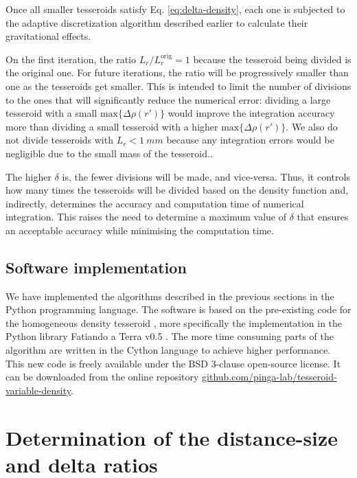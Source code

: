 \documentclass[extra]{gji}
\begin{document}
Once all smaller tesseroids satisfy Eq. \ref{eq:delta-density},
each one is subjected to the adaptive
discretization algorithm described earlier to calculate their gravitational effects.

On the first iteration, the ratio $L_r/L_r^\text{orig} = 1$ because the tesseroid being
divided is the original one.
For future iterations, the ratio will be progressively smaller than one as the
tesseroids get smaller.
This is intended to limit the number of divisions to the ones that will
significantly reduce the numerical error:
dividing a large tesseroid with a small $\text{max}\{ \Delta \rho(r') \}$ would
improve the integration accuracy more than dividing a small tesseroid with a
higher $\text{max}\{ \Delta \rho(r') \}$.
We also do not divide tesseroids with $L_r < 1\ mm$ because any integration errors would
be negligible due to the small mass of the tesseroid..

The higher $\delta$ is, the fewer divisions will be made, and vice-versa.
Thus, it controls how many times the tesseroids will be divided based on the density
function and, indirectly, determines the accuracy and computation time of
numerical integration.
This raises the need to determine a maximum value of $\delta$ that
ensures an acceptable accuracy while minimising the computation time.


\subsection{Software implementation}

We have implemented the algorithms described in the previous sections in the Python
programming language.
The software is based on the pre-existing code for the homogeneous density tesseroid
\citep{Uieda2016}, more specifically the implementation in the Python library Fatiando a
Terra v0.5 \citep{Uieda2013}.
The more time consuming parts of the algorithm are written in the Cython language to
achieve higher performance.
This new code is freely available under the BSD 3-clause open-source license.
It can be downloaded from the online repository
\href{https://github.com/pinga-lab/tesseroid-variable-density}{github.com/pinga-lab/tesseroid-variable-density}.




\section{Determination of the distance-size and delta ratios}
\end{document}
